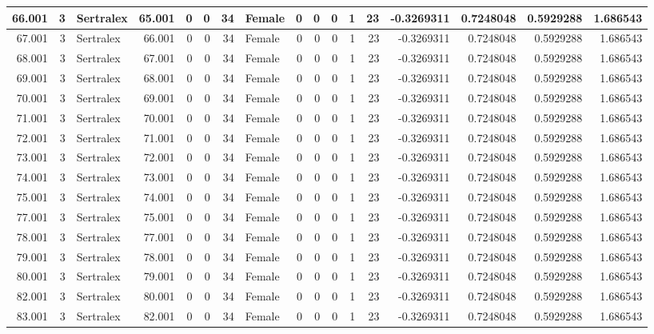 \documentclass[
]{book}
\begin{document}
\begin{table}
\begin{tabular}[t]{r|r|l|r|r|r|r|l|r|r|r|r|r|r|r|r|r}
\hline
66.001 & 3 & Sertralex & 65.001 & 0 & 0 & 34 & Female & 0 & 0 & 0 & 1 & 23 & -0.3269311 & 0.7248048 & 0.5929288 & 1.686543\\
\hline
67.001 & 3 & Sertralex & 66.001 & 0 & 0 & 34 & Female & 0 & 0 & 0 & 1 & 23 & -0.3269311 & 0.7248048 & 0.5929288 & 1.686543\\
\hline
68.001 & 3 & Sertralex & 67.001 & 0 & 0 & 34 & Female & 0 & 0 & 0 & 1 & 23 & -0.3269311 & 0.7248048 & 0.5929288 & 1.686543\\
\hline
69.001 & 3 & Sertralex & 68.001 & 0 & 0 & 34 & Female & 0 & 0 & 0 & 1 & 23 & -0.3269311 & 0.7248048 & 0.5929288 & 1.686543\\
\hline
70.001 & 3 & Sertralex & 69.001 & 0 & 0 & 34 & Female & 0 & 0 & 0 & 1 & 23 & -0.3269311 & 0.7248048 & 0.5929288 & 1.686543\\
\hline
71.001 & 3 & Sertralex & 70.001 & 0 & 0 & 34 & Female & 0 & 0 & 0 & 1 & 23 & -0.3269311 & 0.7248048 & 0.5929288 & 1.686543\\
\hline
72.001 & 3 & Sertralex & 71.001 & 0 & 0 & 34 & Female & 0 & 0 & 0 & 1 & 23 & -0.3269311 & 0.7248048 & 0.5929288 & 1.686543\\
\hline
73.001 & 3 & Sertralex & 72.001 & 0 & 0 & 34 & Female & 0 & 0 & 0 & 1 & 23 & -0.3269311 & 0.7248048 & 0.5929288 & 1.686543\\
\hline
74.001 & 3 & Sertralex & 73.001 & 0 & 0 & 34 & Female & 0 & 0 & 0 & 1 & 23 & -0.3269311 & 0.7248048 & 0.5929288 & 1.686543\\
\hline
75.001 & 3 & Sertralex & 74.001 & 0 & 0 & 34 & Female & 0 & 0 & 0 & 1 & 23 & -0.3269311 & 0.7248048 & 0.5929288 & 1.686543\\
\hline
77.001 & 3 & Sertralex & 75.001 & 0 & 0 & 34 & Female & 0 & 0 & 0 & 1 & 23 & -0.3269311 & 0.7248048 & 0.5929288 & 1.686543\\
\hline
78.001 & 3 & Sertralex & 77.001 & 0 & 0 & 34 & Female & 0 & 0 & 0 & 1 & 23 & -0.3269311 & 0.7248048 & 0.5929288 & 1.686543\\
\hline
79.001 & 3 & Sertralex & 78.001 & 0 & 0 & 34 & Female & 0 & 0 & 0 & 1 & 23 & -0.3269311 & 0.7248048 & 0.5929288 & 1.686543\\
\hline
80.001 & 3 & Sertralex & 79.001 & 0 & 0 & 34 & Female & 0 & 0 & 0 & 1 & 23 & -0.3269311 & 0.7248048 & 0.5929288 & 1.686543\\
\hline
82.001 & 3 & Sertralex & 80.001 & 0 & 0 & 34 & Female & 0 & 0 & 0 & 1 & 23 & -0.3269311 & 0.7248048 & 0.5929288 & 1.686543\\
\hline
83.001 & 3 & Sertralex & 82.001 & 0 & 0 & 34 & Female & 0 & 0 & 0 & 1 & 23 & -0.3269311 & 0.7248048 & 0.5929288 & 1.686543\\

\end{tabular}
\end{table}
\end{document}

